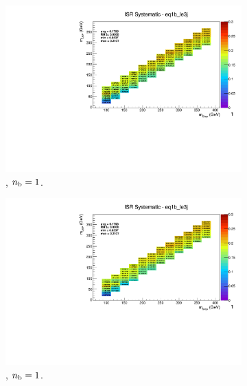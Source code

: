 \begin{figure}[ht!]
\begin{subfigure}[b]{0.32\textwidth}
    \includegraphics[width=\textwidth, page=8]{Figs/sms/t2degen/v19_2/systs/T2_4body_ISR_eq1b_le3j.pdf}
    \caption{\njlow, $n_{\text{b}} = 1$.}
  \end{subfigure}
  \begin{subfigure}[b]{0.32\textwidth}
    \includegraphics[width=\textwidth, page=1]{Figs/sms/t2degen/v19_2/systs/T2_4body_ISR_eq1b_le3j.pdf}
    \caption{\njlow, $n_{\text{b}} = 1$.}
  \end{subfigure}\\
  \begin{subfigure}[b]{0.32\textwidth}

\end{subfigure}
\end{figure}
